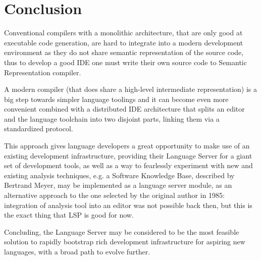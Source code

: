 \section{Conclusion}
\label{sec:review_conclusion}

Conventional compilers with a monolithic architecture, that are only good at executable code generation,
are hard to integrate into a modern development environment as they do not share
semantic representation of the source code, thus to develop a good IDE one must write their own
source code to Semantic Representation compiler.

A modern compiler (that does share a high-level intermediate representation) is
a big step towards simpler language toolings and it can become even more convenient
combined with a distributed IDE architecture that splits an editor and the language toolchain
into two disjoint parts, linking them via a standardized protocol.

This approach gives language developers a great opportunity to make use of an
existing development infrastructure, providing their Language Server for a
giant set of development tools, as well as a way to fearlessly experiment with new and
existing analysis techniques, e.g. a Software Knowledge Base\cite{Wanghong}, described by
Bertrand Meyer, may be implemented as a language server module, as an
alternative approach to the one selected by the original author in 1985:
integration of analysis tool into an editor was not possible back then, but this is
the exact thing that LSP is good for now.

Concluding, the Language Server may be considered to be the most feasible
solution to rapidly bootstrap rich development infrastructure for aspiring new
languages, with a broad path to evolve further.